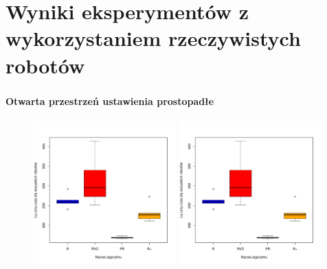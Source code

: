 \documentclass{beamer}
\begin{document}
\section{Wyniki eksperymentów z wykorzystaniem  rzeczywistych robotów}
\begin{frame}
\frametitle{\secname}
\framesubtitle{Otwarta przestrzeń ustawienia prostopadłe}

\begin{figure}[!ht]
\centering
	\includegraphics[page = 1, width=0.49\textwidth]{img/Robots_Open_space.pdf}
	\includegraphics[page = 2, width=0.49\textwidth]{img/Robots_Open_space.pdf}
\end{figure}



\end{frame}
\end{document}
